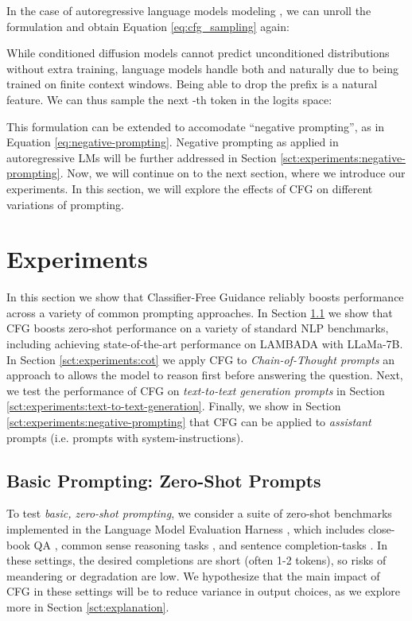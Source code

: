 \documentclass{article}
\begin{document}
In the case of autoregressive language models modeling , we can unroll the formulation and obtain Equation \ref{eq:cfg_sampling} again:



While conditioned diffusion models cannot predict unconditioned distributions without extra training, language models handle both  and  naturally due to being trained on finite context windows. Being able to drop the prefix  is a natural feature. 
We can thus sample the next -th token  in the logits space:





This formulation can be extended to accomodate ``negative prompting'', as in Equation \ref{eq:negative-prompting}. Negative prompting as applied in autoregressive LMs will be further addressed in Section \ref{sct:experiments:negative-prompting}. Now, we will continue on to the next section, where we introduce our experiments. In this section, we will explore the effects of CFG on different variations of prompting.

\section{Experiments}
\label{sct:experiments}

In this section we show that Classifier-Free Guidance reliably boosts performance across a variety of common prompting approaches. In Section \ref{sct:experiments:benchmarks} we show that CFG boosts zero-shot performance on a variety of standard NLP benchmarks, including achieving state-of-the-art performance on LAMBADA with LLaMa-7B. In Section \ref{sct:experiments:cot} we apply CFG to  \textit{Chain-of-Thought prompts} \cite{nye2022show,COT} an approach to allows the model to reason first before answering the question. Next, we test the performance of CFG on \textit{text-to-text generation prompts} in Section \ref{sct:experiments:text-to-text-generation}. Finally, we show in Section \ref{sct:experiments:negative-prompting} that CFG can be applied to \textit{assistant} prompts (i.e. prompts with system-instructions).

\subsection{Basic Prompting: Zero-Shot Prompts}
\label{sct:experiments:benchmarks}

To test \textit{basic, zero-shot prompting}, we consider a suite of zero-shot benchmarks implemented in the Language Model Evaluation Harness \cite{eval-harness}, which includes close-book QA \cite{auer2023sciqa, joshi2017triviaqa}, common sense reasoning tasks \cite{zellers2019hellaswag, sakaguchi2021winogrande, clark2019boolq, bisk2020piqa, cobbe2021training, basu2020aqua, arc}, and sentence completion-tasks \cite{paperno2016lambada}. In these settings, the desired completions are short (often 1-2 tokens), so risks of meandering \cite{spangher2023sequentially} or degradation \cite{holtzman2019curious} are low. We hypothesize that the main impact of CFG in these settings will be to reduce variance in output choices, as we explore more in Section \ref{sct:explanation}.
\end{document}

